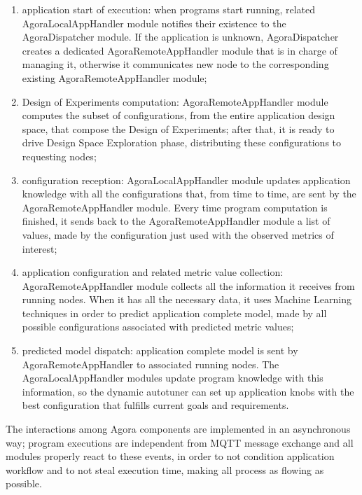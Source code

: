 \begin{enumerate}

    \item application start of execution: when programs start running, related AgoraLocalAppHandler module notifies their existence to the AgoraDispatcher module. If the application is unknown, AgoraDispatcher creates a dedicated AgoraRemoteAppHandler module that is in charge of managing it, otherwise it communicates new node to the corresponding existing AgoraRemoteAppHandler module;
    
    \item Design of Experiments computation: AgoraRemoteAppHandler module computes the subset of configurations, from the entire application design space, that compose the Design of Experiments; after that, it is ready to drive Design Space Exploration phase, distributing these configurations to requesting nodes;
    
    \item configuration reception: AgoraLocalAppHandler module updates application knowledge with all the configurations that, from time to time, are sent by the AgoraRemoteAppHandler module. Every time program computation is finished, it sends back to the AgoraRemoteAppHandler module a list of values, made by the configuration just used with the observed metrics of interest;
    
    \item application configuration and related metric value collection: A\-go\-ra\-Re\-mote\-App\-Handler module collects all the information it receives from running nodes. When it has all the necessary data, it uses Machine Learning techniques in order to predict application complete model, made by all possible configurations associated with predicted metric values;
    
    \item predicted model dispatch: application complete model is sent by AgoraRemoteAppHandler to associated running nodes. The AgoraLocalAppHandler modules update program knowledge with this information, so the dynamic autotuner can set up application knobs with the best configuration that fulfills current goals and requirements.

\end{enumerate}

The interactions among Agora components are implemented in an asynchronous way; program executions are independent from MQTT message exchange and all modules properly react to these events, in order to not condition application workflow and to not steal execution time, making all process as flowing as possible.
